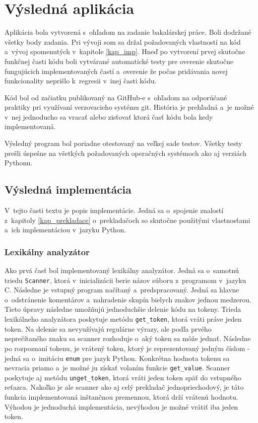 \chapter{Výsledná aplikácia}
Aplikácia bola vytvorená s~ohľadom na zadanie bakalárskej práce. Boli dodržané všetky body zadania. Pri vývoji som sa držal požadovaných vlastností na kód a~vývoj spomenutých v~kapitole \ref{kap_imp}. Hneď po vytvorení prvej skutočne funkčnej časti kódu boli vytvárané automatické testy pre overenie skutočne fungujúcich implementovaných častí a~overenie že počas pridávania novej funkcionality neprišlo k~regresii v~inej časti kódu. 

Kód bol od začiatku publikovaný na GitHub-e s~ohľadom na odporúčané praktiky pri využívaní verzovacieho systému git. História je prehľadná a~je možné v~nej jednoducho sa vracať alebo zisťovať ktorá časť kódu bola kedy implementovaná.

Výsledný program bol poriadne otestovaný na veľkej sade testov. Všetky testy prešli úspešne na všetkých požadovaných operačných systémoch ako aj verziách Pythonu.

\section{Výsledná implementácia}
V~tejto časti textu je popis implementácie. Jedná sa o~spojenie znalostí z~kapitoly \ref{kap_prekladace} o~prekladačoch so skutočne použitými vlastnosťami a~ich implementáciou v~jazyku Python.
\subsection{Lexikálny analyzátor}
Ako prvá časť bol implementovaný lexikálny analyzátor. Jedná sa o~samotnú triedu \texttt{Scanner}, ktorá v~inicializácii berie názov súboru z~programom v~jazyku C. Následne je vstupný program načítaný a~predspracovaný. Jedná sa hlavne o~odstránenie komentárov a~nahradenie skupín bielych znakov jednou medzerou. Tieto úpravy následne umožňujú jednoduchšie delenie kódu na tokeny. Trieda lexikálneho analyzátora poskytuje metódu \texttt{get\_token}, ktorá vráti práve jeden token. Na delenie sa nevyužívajú regulárne výrazy, ale podľa prvého neprečítaného znaku sa scanner rozhoduje o~aký token sa môže jednať. Následne po rozpoznaní tokenu, je vrátený token, ktorý je reprezentovaný jedným číslom - jedná sa o~imitáciu \texttt{enum} pre jazyk Python. Konkrétna hodnota tokenu sa nevracia priamo a~je možné ju získať volaním funkcie \texttt{get\_value}. Scanner poskytuje aj metódu \texttt{unget\_token}, ktorá vráti jeden token späť do vstupného reťazca. Nakoľko je ale scanner ako aj celý prekladač jednopriechodový, je táto funkcia implementovaná inštančnou premennou, ktorá drží vrátenú hodnotu. Výhodou je jednoduchá implementácia, nevýhodou je možné vrátiť iba jeden token.

